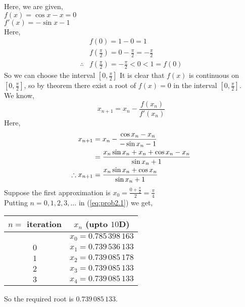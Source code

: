\documentclass[12pt,class=book,crop=false]{standalone}
\begin{document}
\begin{soln}
    Here, we are given,\\
    \indent \( f(x)=\cos x-x=0 \)\\
    \indent \( f'(x)=-\sin x-1 \)\\
    Here,
    \begin{align*}
                   & f(0)=1-0=1                                      \\
                   & f(\frac{\pi}{2})=0-\frac{\pi}{2}=-\frac{\pi}{2} \\
        \therefore & f(\frac{\pi}{2})=-\frac{\pi}{2}<0<1=f(0)
    \end{align*}
    So we can choose the interval \( [0,\frac{\pi}{2}] \)
    It is clear that \( f(x) \) is continuous on \( [0,\frac{\pi}{2}]\), so by theorem there exist a root of \( f(x)=0 \) in the interval \( [0,\frac{\pi}{2}]\).\\
    We know,
    \[
        x_{n+1}=x_n-\frac{f(x_n)}{f'(x_n)}
    \]
    Here,
    \begin{align}
        x_{n+1}            & =x_n-\frac{\cos x_n-x_n}{-\sin x_n -1}\notag                \\
                           & =\frac{x_n\sin x_n+x_n+\cos x_n-x_n}{\sin x_n +1}\notag     \\
        \therefore x_{n+1} & =\frac{x_n\sin x_n+\cos x_n}{\sin x_n +1}\label{eq:prob2.1}
    \end{align}
    Suppose the first approximation is \( x_0=\frac{0+\frac{\pi}{2}}{2}=\frac{\pi}{4} \)\\
    Putting \( n=0,1,2,3,\dots \) in (\ref{eq:prob2.1}) we get,
    \begin{center}
        \begin{tabular}{cc}
            \toprule
            \( n= \) iteration & \( x_n  \) (upto \( 10 \)D) \\\midrule
                               & \(x_0  = 0.785\,398\,163\)  \\
            \( 0 \)            & \(x_1  = 0.739\,536\,133\)  \\
            \( 1 \)            & \(x_2= 0.739\,085\,178  \)  \\
            \( 2 \)            & \(x_3= 0.739\,085\,133  \)  \\
            \( 3 \)            & \(x_4= 0.739\,085\,133  \)  \\\bottomrule
        \end{tabular}
    \end{center}
    So the required root is \( 0.739\,085\,133 \).
\end{soln}
\end{document}
